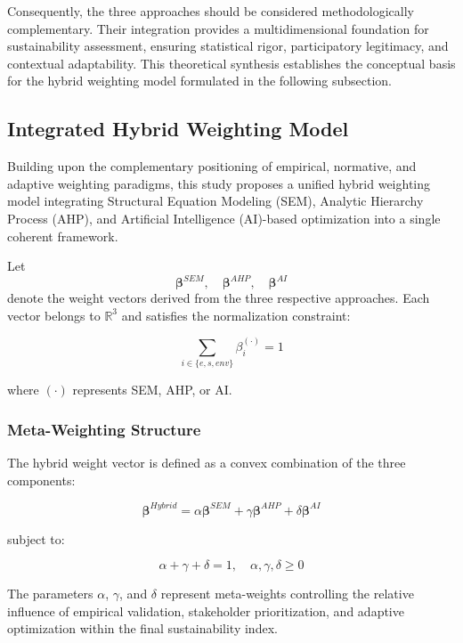 \documentclass[11pt,a4paper]{article}
\begin{document}
Consequently, the three approaches should be considered methodologically complementary. Their integration provides a multidimensional foundation for sustainability assessment, ensuring statistical rigor, participatory legitimacy, and contextual adaptability. This theoretical synthesis establishes the conceptual basis for the hybrid weighting model formulated in the following subsection.

\subsection{Integrated Hybrid Weighting Model}


Building upon the complementary positioning of empirical, normative, and adaptive weighting paradigms, this study proposes a unified hybrid weighting model integrating Structural Equation Modeling (SEM), Analytic Hierarchy Process (AHP), and Artificial Intelligence (AI)-based optimization into a single coherent framework.

Let 
\[
\boldsymbol{\beta}^{SEM}, \quad
\boldsymbol{\beta}^{AHP}, \quad
\boldsymbol{\beta}^{AI}
\]
denote the weight vectors derived from the three respective approaches. Each vector belongs to $\mathbb{R}^3$ and satisfies the normalization constraint:

\begin{equation}
\sum_{i \in \{e,s,env\}} \beta_i^{(\cdot)} = 1
\end{equation}

where $(\cdot)$ represents SEM, AHP, or AI.

\subsubsection{Meta-Weighting Structure}

The hybrid weight vector is defined as a convex combination of the three components:

\begin{equation}
\boldsymbol{\beta}^{Hybrid} =
\alpha \boldsymbol{\beta}^{SEM}
+
\gamma \boldsymbol{\beta}^{AHP}
+
\delta \boldsymbol{\beta}^{AI}
\end{equation}

subject to:

\begin{equation}
\alpha + \gamma + \delta = 1, \quad
\alpha, \gamma, \delta \geq 0
\end{equation}

The parameters $\alpha$, $\gamma$, and $\delta$ represent meta-weights controlling the relative influence of empirical validation, stakeholder prioritization, and adaptive optimization within the final sustainability index.
\end{document}
